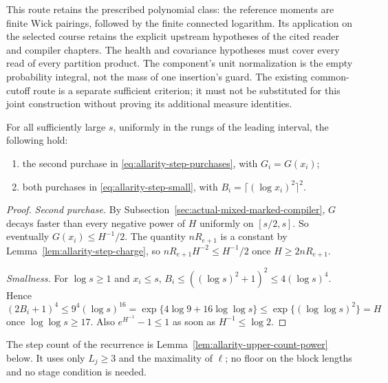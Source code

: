 This route retains the prescribed polynomial class: the reference
moments are finite Wick pairings, followed by the finite connected
logarithm. Its application on the selected course retains the
explicit upstream hypotheses of the cited reader and compiler
chapters. The health and covariance hypotheses must
cover every read of every partition product. The component's unit
normalization is the empty probability integral, not the mass of one
insertion's guard. The existing common-cutoff route is a separate
sufficient criterion; it must not be substituted for this joint
construction without proving its additional measure identities.

\begin{lemma}
\label{lem:allarity-step-purchases}
For all sufficiently large $s$, uniformly in the rungs of the leading
interval, the following hold:
\begin{enumerate}
\item the second purchase in \eqref{eq:allarity-step-purchases}, with
 $G_i=G(x_i)$;
\item both purchases in \eqref{eq:allarity-step-small}, with
 $B_i=\lceil(\log x_i)^2\rceil^2$.
\end{enumerate}
\end{lemma}
\begin{proof}
\emph{Second purchase.} By Subsection~\ref{sec:actual-mixed-marked-compiler},
$G$ decays faster than every negative power of $H$ uniformly on
$[s/2,s]$. So eventually $G(x_i)\le H^{-1}/2$. The quantity
$nR_{e+1}$ is a constant by Lemma~\ref{lem:allarity-step-charge}, so
$nR_{e+1}H^{-2}\le H^{-1}/2$ once $H\ge2nR_{e+1}$.

\emph{Smallness.} For $\log s\ge1$ and $x_i\le s$,
$B_i\le((\log s)^2+1)^2\le4(\log s)^4$. Hence
\[
 (2B_i+1)^4\le9^4(\log s)^{16}
 =\exp\{4\log9+16\log\log s\}\le\exp\{(\log\log s)^2\}=H
\]
once $\log\log s\ge17$. Also $e^{H^{-1}}-1\le1$ as soon as
$H^{-1}\le\log2$.
\end{proof}

The step count of the recurrence is
Lemma~\ref{lem:allarity-upper-count-power} below. It uses only $L_j\ge3$
and the maximality of $\ell$; no floor on the block lengths and no stage
condition is needed.

